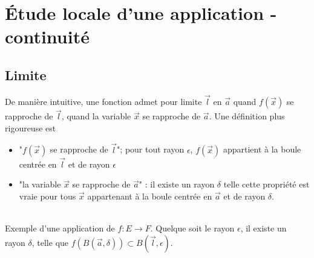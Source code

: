 \documentclass{book}
\begin{document}
\section{Étude locale d'une application - continuité}
\subsection{Limite}
De manière intuitive, une fonction admet pour limite $\vec{l}$ en $\vec{a}$ quand $f(\vec{x})$ se rapproche  de $\vec{l}$,  quand  la variable $\vec{x}$ se rapproche de $\vec{a}$. Une définition plus rigoureuse est 
\begin{itemize}  
\item "$f(\vec{x})$ se rapproche de $\vec{l}$"; pour tout rayon $\epsilon$, $f(\vec{x})$ appartient à la boule centrée en $\vec{l}$ et de rayon $\epsilon$
\item  "la variable $\vec{x}$ se rapproche de $\vec{a}$" : il existe un rayon $\delta$ telle cette propriété est vraie pour tous $\vec{x}$ appartenant à la boule centrée en $\vec{a}$ et de rayon $\delta$. 
\end{itemize} 
\begin{center} 
\\
 Exemple d'une application de $f:E\to F$. Quelque soit le rayon $\epsilon$, il existe un rayon $\delta$, telle que $f(B(\vec{a},\delta))\subset B(\vec{l},\epsilon)$.
 \end{center}
\end{document}
